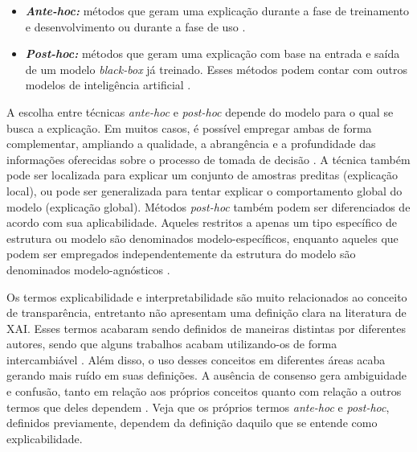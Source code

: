\begin{itemize}
    \item \textbf{\textit{Ante-hoc:}} métodos que geram uma explicação durante a fase de treinamento e desenvolvimento ou durante a fase de uso \citep{Marino2025}.
    \item \textbf{\textit{Post-hoc:}} métodos que geram uma explicação com base na entrada e saída de um modelo \textit{black-box} já treinado. Esses métodos podem contar com outros modelos de inteligência artificial \citep{Guidotti2022}.
\end{itemize}

A escolha entre técnicas \textit{ante-hoc} e \textit{post-hoc} depende do modelo para o qual se busca a explicação. Em muitos casos, é possível empregar ambas de forma complementar, ampliando a qualidade, a abrangência e a profundidade das informações oferecidas sobre o processo de tomada de decisão \citep{Mersha2024}. A técnica também pode ser localizada para explicar um conjunto de amostras preditas (explicação local), ou pode ser generalizada para tentar explicar o comportamento global do modelo (explicação global). Métodos \textit{post-hoc} também podem ser diferenciados de acordo com sua aplicabilidade. Aqueles restritos a apenas um tipo específico de estrutura ou modelo são denominados modelo-específicos, enquanto aqueles que podem ser empregados independentemente da estrutura do modelo são denominados modelo-agnósticos \citep{Longo2024}.

Os termos explicabilidade e interpretabilidade são muito relacionados ao conceito de transparência, entretanto não apresentam uma definição clara na literatura de XAI. Esses termos acabaram sendo definidos de maneiras distintas por diferentes autores, sendo que alguns trabalhos acabam utilizando-os de forma intercambiável \citep{Mersha2024}. Além disso, o uso desses conceitos em diferentes áreas acaba gerando mais ruído em suas definições. A ausência de consenso gera ambiguidade e confusão, tanto em relação aos próprios conceitos quanto com relação a outros termos que deles dependem \citep{Erasmus2021}. Veja que os próprios termos \textit{ante-hoc} e \textit{post-hoc}, definidos previamente, dependem da definição daquilo que se entende como explicabilidade.

